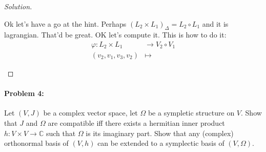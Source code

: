 \begin{proof}[Solution]
\begin{enumerate}[label=\alph*.]
		Ok let's have a go at the hint. Perhaps  $(L_2\times L_1)_\Delta= L_2\circ L_1$ and it is lagrangian. That'd be great. OK let's compute it. This is how to do it:
\begin{align*}
	\varphi: L_2\times L_1 &\longrightarrow V_2\circ V_1 \\
	(v_2,v_1,v_3,v_2) &\longmapsto 
\end{align*}



	
\end{enumerate}
\end{proof}

\paragraph{Problem 4:} Let $(V,J)$ be a complex vector space, let $\Omega$ be a sympletic structure on $V$. Show that $J$ and $\Omega$ are compatible iff there exists a hermitian inner product $h:V\times V\to \mathbb{C}$ such that $\Omega$ is its imaginary part. Show that any (complex) orthonormal basis of  $(V,h)$ can be extended to a symplectic basis of $(V,\Omega)$.

